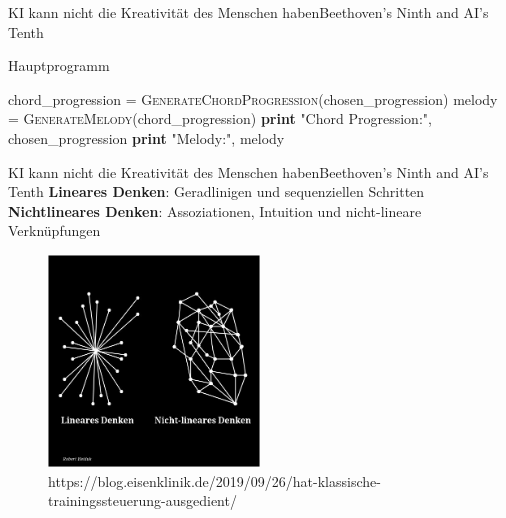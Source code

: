 \documentclass[169,9pt]{beamer}
\begin{document}
\begin{frame}{KI kann nicht die Kreativität des Menschen haben}{Beethoven's Ninth and AI's Tenth}\begin{algorithm}[H]
\caption{Hauptprogramm}
\begin{algorithmic}[1]
\State chord\_progression = \textsc{GenerateChordProgression}(chosen\_progression)
\State melody = \textsc{GenerateMelody}(chord\_progression)
\State \textbf{print} "Chord Progression:", chosen\_progression
\State \textbf{print} "Melody:", melody
\State
\end{algorithmic}
\end{algorithm}
\end{frame}


\begin{frame}{KI kann nicht die Kreativität des Menschen haben}{Beethoven's Ninth
and AI's Tenth}
\textbf{Lineares Denken}: Geradlinigen und sequenziellen Schritten\\
\textbf{Nichtlineares Denken}: Assoziationen, Intuition und nicht-lineare Verknüpfungen
\begin{figure}[h]
    \centering
    \includegraphics[width=0.5\textwidth]{images/non-linear-1.jpg}
    \caption{\smaller \smaller https://blog.eisenklinik.de/2019/09/26/hat-klassische-trainingssteuerung-ausgedient/}
    \label{fig:my_label}
\end{figure}
\end{frame}
\end{document}

